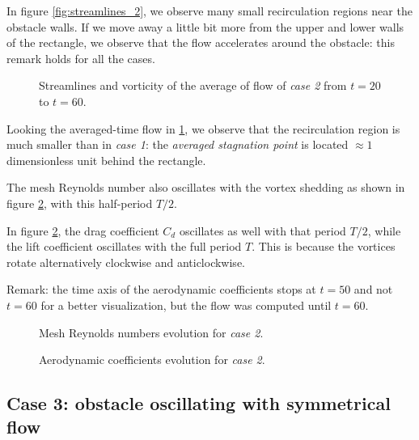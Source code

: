 \documentclass[11 pt]{article}
\begin{document}
In figure \ref{fig:streamlines_2}, we observe many small recirculation regions near the obstacle walls. If we move away a little bit more from the upper and lower walls of the rectangle, we observe that the flow accelerates around the obstacle: this remark holds for all the cases.


\begin{figure}[H]
    \centering
    
    \caption{Streamlines and vorticity of the average of flow of \textit{case 2} from $t=20$ to $t=60$.}
    \label{fig:averaging_2}
\end{figure}

Looking the averaged-time flow in \ref{fig:averaging_2}, we observe that the recirculation region is much smaller than in \textit{case 1}: the \textit{averaged stagnation point} is located $\approx 1$ dimensionless unit behind the rectangle.

The mesh Reynolds number also oscillates with the vortex shedding as shown in figure \ref{fig:mesh_re_case2}, with this half-period $T/2$.

In figure \ref{fig:mesh_re_case2}, the drag coefficient $C_d$ oscillates as well with that period $T/2$, while the lift coefficient oscillates with the full period $T$. This is because the vortices rotate alternatively clockwise and anticlockwise.

Remark: the time axis of the aerodynamic coefficients stops at $t=50$ and not $t=60$ for a better visualization, but the flow was computed until $t=60$.

\begin{figure}[H]
    \centering
    
    \caption{Mesh Reynolds numbers evolution for \textit{case 2}.}
    \label{fig:mesh_re_case2}
\end{figure}

\begin{figure}[H]
    \centering
    
    \caption{Aerodynamic coefficients evolution for \textit{case 2}.}
    \label{fig:drag_case2}
\end{figure}


\subsection{Case 3: obstacle oscillating with symmetrical flow}
\end{document}
